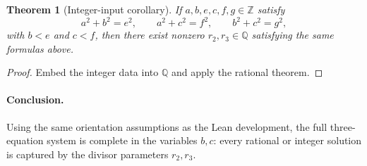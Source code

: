 \documentclass[11pt]{article}
\newtheorem{theorem}{Theorem}
\begin{document}
\begin{theorem}[Integer-input corollary]
If $a,b,e,c,f,g\in\mathbb{Z}$ satisfy
\[
a^2+b^2=e^2,\qquad
a^2+c^2=f^2,\qquad
b^2+c^2=g^2,
\]
with $b<e$ and $c<f$, then there exist nonzero $r_2,r_3\in\mathbb{Q}$ satisfying
the same formulas above.
\end{theorem}

\begin{proof}
Embed the integer data into $\mathbb{Q}$ and apply the rational theorem.
\end{proof}

\paragraph{Conclusion.}
Using the same orientation assumptions as the Lean development, the full
three-equation system is complete in the variables $b,c$:
every rational or integer solution is captured by the divisor parameters
$r_2,r_3$.
\end{document}
